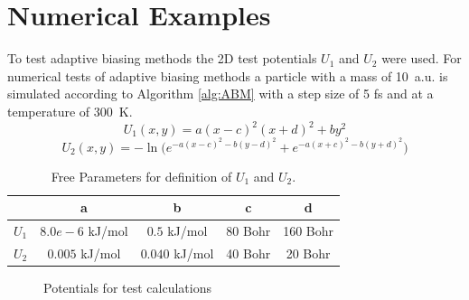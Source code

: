 \section{Numerical Examples}
\label{sec:num examples}

To test adaptive biasing methods the 2D test potentials $U_1$ and $U_2$ were used. For numerical tests of adaptive biasing methods a particle with a mass of 10~a.u. is simulated according to Algorithm \ref{alg:ABM} with a step size of 5 fs and at a temperature of 300~K.
\begin{equation}
  U_1(x,y) = a(x-c)^2(x+d)^2 + by^2 \label{eq:U1}
\end{equation}
\begin{equation}
  U_2(x,y) = -\ln\bigl( e^{-a(x-c)^2 - b(y-d)^2} + e^{-a(x+c)^2 - b(y+d)^2} \bigr) \label{eq:U2S}
\end{equation}
\begin{table}[H]
        \centering
        \caption{Free Parameters for definition of $U_1$ and $U_2$.}
        \begin{tabular}{ c | c  c  c  c }
                & a & b & c & d   \\
                \hline
                $U_1$  & $8.0e-6$ kJ/mol & $0.5$ kJ/mol & 80 Bohr & 160 Bohr \\
                $U_2$  & $0.005$ kJ/mol  & $0.040$ kJ/mol & 40 Bohr & 20 Bohr \\
        \end{tabular}
        \label{tab:2D pots}
\end{table}

\begin{figure}[H]
    \centering
    \vspace{-1cm}
    \caption{Potentials for test calculations}
\label{fig:potentials}%
\end{figure}
